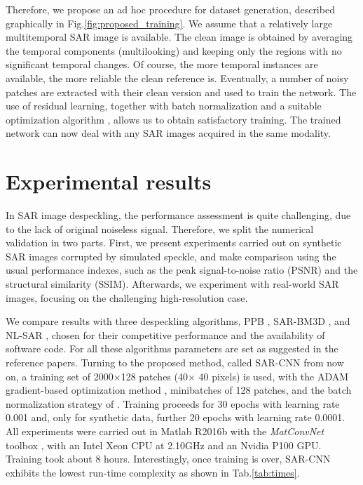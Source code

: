 \documentclass{article}
\begin{document}
Therefore, we propose an ad hoc procedure for dataset generation, described graphically in Fig.\ref{fig:proposed_training}.
We assume that a relatively large multitemporal SAR image is available.
The clean image is obtained by averaging the temporal components (multilooking) and keeping only the regions with no significant temporal changes.
Of course, the more temporal instances are available, the more reliable the clean reference is.
Eventually, a number of noisy patches are extracted with their clean version and used to train the network.
The use of residual learning, together with batch normalization and a suitable optimization algorithm \cite{Kingma2015}, allows us to obtain satisfactory training.
The trained network can now deal with any SAR images acquired in the same modality.

\section{Experimental results}\label{sec:experiments}

In SAR image despeckling, the performance assessment is quite challenging,
due to the lack of original noiseless signal.
Therefore, we split the numerical validation in two parts.
First, we present experiments carried out on synthetic SAR images corrupted by simulated speckle,
and make comparison using the usual performance indexes,
such as the peak signal-to-noise ratio (PSNR) and the structural similarity (SSIM).
Afterwards, we experiment with real-world SAR images, focusing on the challenging high-resolution case.

We compare results with three despeckling algorithms, PPB \cite{Deledalle2009}, SAR-BM3D \cite{Parrilli2012}, and NL-SAR \cite{Deledalle2015},
chosen for their competitive performance and the availability of software code.
For all these algorithms parameters are set as suggested in the reference papers.
Turning to the proposed method, called SAR-CNN from now on,
a training set of 2000$\times$128 patches (40$\times$ 40 pixels) is used, with the ADAM gradient-based optimization method \cite{Kingma2015}, minibatches of 128 patches, and the batch normalization strategy of \cite{Ioffe2015}.
Training proceeds for 30 epochs with learning rate 0.001 and, only for synthetic data, further 20 epochs with learning rate 0.0001.
All experiments were carried out in Matlab R2016b with the \emph{MatConvNet} toolbox \cite{Vedaldi2015}, with an Intel Xeon CPU at 2.10GHz and an Nvidia P100 GPU.
Training took about 8 hours.
Interestingly, once training is over, SAR-CNN exhibits the lowest run-time complexity as shown in Tab.\ref{tab:times}.
\end{document}
